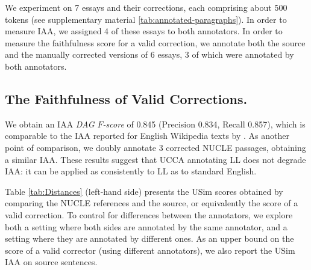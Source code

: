 \documentclass[a4paper, 11pt]{article}
\begin{document}
We experiment on 7 essays and their corrections, each comprising about 500 tokens (see supplementary material \ref{tab:annotated-paragraphs}).
In order to measure IAA, we assigned 4 of these essays to both annotators.
In order to measure the faithfulness score for a valid correction,
we annotate both the source
and the manually corrected versions of 6 essays,
3 of which were annotated by both annotators.

\subsection{The Faithfulness of Valid Corrections.}\label{subsec:valid_faithfulness}
We obtain an IAA {\it DAG $F$-score} of 0.845
(Precision 0.834, Recall 0.857), which
is comparable to the IAA reported for English Wikipedia texts by \citet{abend2013universal}.
As another point of comparison, we doubly annotate 3 corrected
NUCLE \cite{dahlmeier2013building} passages, obtaining a similar IAA.
These results suggest that UCCA annotating LL does not degrade IAA:
it can be applied as consistently to LL as to standard English.

Table \ref{tab:Distances} (left-hand side) presents the {\sc USim} scores obtained by comparing 
the NUCLE references and the source, or equivalently the score of a valid correction.
To control for differences between the annotators, we explore both
a setting where both sides are annotated by the same annotator,
and a setting where they are annotated by different ones.
As an upper bound on the score of a valid corrector (using different annotators),
we also report the {\sc USim} IAA on source sentences. 
\end{document}
